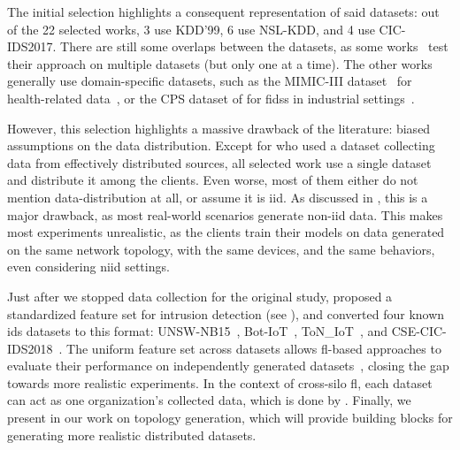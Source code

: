 The initial selection highlights a consequent representation of said datasets: out of the 22 selected works, 3 use KDD'99, 6 use NSL-KDD, and 4 use CIC-IDS2017.
There are still some overlaps between the datasets, as some works~\cite{zhao_MultiTaskNetworkAnomaly_2019,fan_IoTDefenderFederatedTransfer_2020,qin_LineSpeedScalableIntrusion_2020,chen_IntrusionDetectionWireless_2020} test their approach on multiple datasets (but only one at a time).
The other works generally use domain-specific datasets, such as the MIMIC-III dataset~\cite{johnson_MIMICIIIfreelyaccessible_2016} for health-related data~\cite{schneble_Attackdetectionusing_2019}, or the CPS dataset of \textcite{morris_IndustrialControlSystem_2014} for \glspl{fids} in industrial settings~\cite{li_DeepFedFederatedDeep_2020}.

However, this selection highlights a massive drawback of the literature: biased assumptions on the data distribution.
Except for  who used a dataset collecting data from effectively distributed sources, all selected work use a single dataset and distribute it among the clients.
Even worse, most of them either do not mention data-distribution at all, or assume it is \gls{iid}.
As discussed in , this is a major drawback, as most real-world scenarios generate non-\gls{iid} data.
This makes most experiments unrealistic, as the clients train their models on data generated on the same network topology, with the same devices, and the same behaviors, even considering \gls{niid} settings.

Just after we stopped data collection for the original study, \textcite{sarhan_StandardFeatureSet_2022} proposed a standardized feature set for intrusion detection (see ), and converted four known \gls{ids} datasets to this format: UNSW-NB15~\cite{moustafa_UNSWNB15comprehensivedata_2015}, Bot-IoT~\cite{koroniotis_developmentrealisticbotnet_2019}, ToN\_IoT~\cite{moustafa_FederatedTON_IoTWindows_2020}, and CSE-CIC-IDS2018~\cite{sharafaldin_GeneratingNewIntrusion_2018}.
The uniform feature set across datasets allows \gls{fl}-based approaches to evaluate their performance on independently generated datasets~\cite{popoola_FederatedDeepLearning_2021,decarvalhobertoli_Generalizingintrusiondetection_2023}, closing the gap towards more realistic experiments.
In the context of cross-silo \gls{fl}, each dataset can act as one organization's collected data, which is done by  \textcite{de_carvalho_bertoli_generalizing_2023}.
Finally, we present in  our work on topology generation, which will provide building blocks for generating more realistic distributed datasets.



